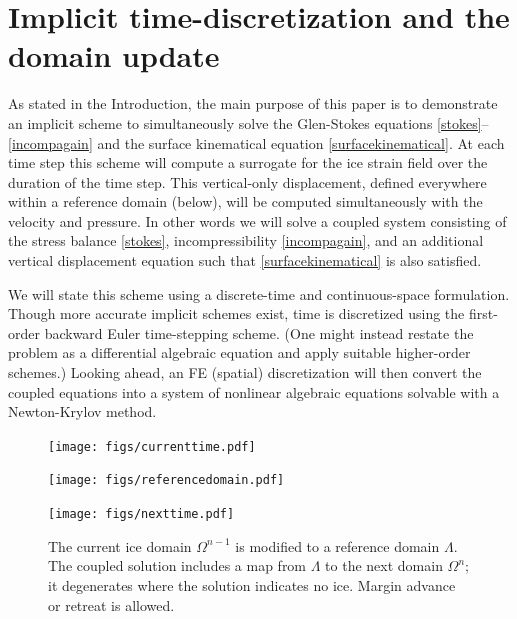 \documentclass[letterpaper,final,12pt,reqno]{amsart}
\begin{document}
\section{Implicit time-discretization and the domain update} \label{sec:implicitstep}

As stated in the Introduction, the main purpose of this paper is to demonstrate an implicit scheme to simultaneously solve the Glen-Stokes equations \eqref{stokes}--\eqref{incompagain} and the surface kinematical equation \eqref{surfacekinematical}.  At each time step this scheme will compute a surrogate for the ice strain field over the duration of the time step.  This vertical-only displacement, defined everywhere within a reference domain (below), will be computed simultaneously with the velocity and pressure.  In other words we will solve a coupled system consisting of the stress balance \eqref{stokes}, incompressibility \eqref{incompagain}, and an additional vertical displacement equation such that \eqref{surfacekinematical} is also satisfied.

We will state this scheme using a discrete-time and continuous-space formulation.  Though more accurate implicit schemes exist, time is discretized using the first-order backward Euler time-stepping scheme.  (One might instead restate the problem as a differential algebraic equation and apply suitable higher-order schemes.)  Looking ahead, an FE (spatial) discretization will then convert the coupled equations into a system of nonlinear algebraic equations solvable with a Newton-Krylov method.


\begin{figure}[ht]
\begin{center}
\texttt{[image: figs/currenttime.pdf]}
\vspace{-6mm}

\texttt{[image: figs/referencedomain.pdf]}
\vspace{-1mm}

\texttt{[image: figs/nexttime.pdf]}
\end{center}
\caption{The current ice domain $\Omega^{n-1}$ is modified to a reference domain $\Lambda$.  The coupled solution includes a map from $\Lambda$ to the next domain $\Omega^n$; it degenerates where the solution indicates no ice.  Margin advance or retreat is allowed.}
\label{fig:domainupdate}
\end{figure}
\end{document}
